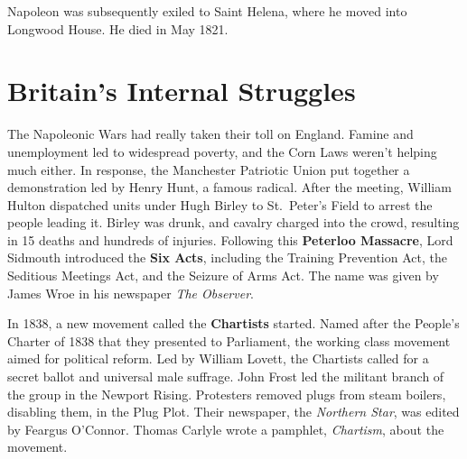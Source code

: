 Napoleon was subsequently exiled to Saint Helena, where he moved into Longwood House.
He died in May 1821.

\section{Britain's Internal Struggles}

The Napoleonic Wars had really taken their toll on England.
Famine and unemployment led to widespread poverty, and the Corn Laws weren't helping much either.
In response, the Manchester Patriotic Union put together a demonstration led by Henry Hunt, a famous radical.
After the meeting,
William Hulton dispatched units under Hugh Birley to St.\ Peter's Field
to arrest the people leading it.
Birley was drunk, and cavalry charged into the crowd,
resulting in 15 deaths and hundreds of injuries.
Following this \textbf{Peterloo Massacre},
Lord Sidmouth introduced the \textbf{Six Acts}, including
the Training Prevention Act,
the Seditious Meetings Act,
and the Seizure of Arms Act.
The name was given by James Wroe in his newspaper \textit{The Observer}.

In 1838, a new movement called the \textbf{Chartists} started.
Named after the People's Charter of 1838 that they presented to Parliament,
the working class movement aimed for political reform.
Led by William Lovett, the Chartists called for a secret ballot and universal male suffrage.
John Frost led the militant branch of the group in the Newport Rising.
Protesters removed plugs from steam boilers, disabling them, in the Plug Plot.
Their newspaper, the \textit{Northern Star}, was edited by Feargus O'Connor.
Thomas Carlyle wrote a pamphlet, \textit{Chartism}, about the movement.
